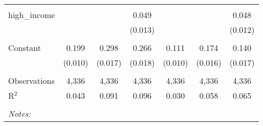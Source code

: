 \begin{table}[!htbp]
\begin{tabular}{@{\extracolsep{5pt}}lcccccc}
  & & & & & & \\ 
 high\_income &  &  & 0.049 &  &  & 0.048 \\ 
  &  &  & (0.013) &  &  & (0.012) \\ 
  & & & & & & \\ 
 Constant & 0.199 & 0.298 & 0.266 & 0.111 & 0.174 & 0.140 \\ 
  & (0.010) & (0.017) & (0.018) & (0.010) & (0.016) & (0.017) \\ 
  & & & & & & \\ 
Observations & 4,336 & 4,336 & 4,336 & 4,336 & 4,336 & 4,336 \\ 
R$^{2}$ & 0.043 & 0.091 & 0.096 & 0.030 & 0.058 & 0.065 \\ 
\hline \\[-1.8ex] 
\textit{Notes:} & \multicolumn{6}{l}{} \\ 
\end{tabular} 
\end{table} 
